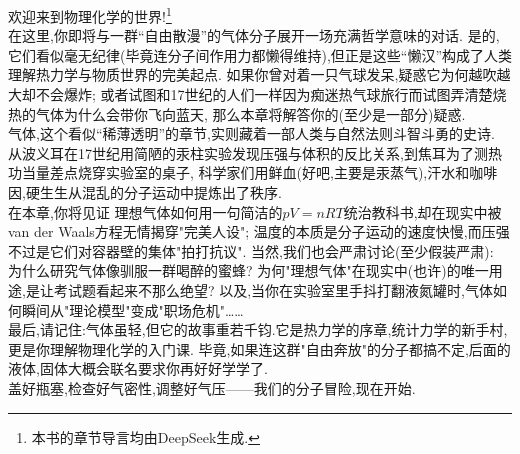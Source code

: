 \documentclass{ctexart}
\begin{document}
\pagestyle{plain}
%
\begin{center}
\end{center}\vspace{15pt}

\indent 欢迎来到物理化学的世界!\footnote{本书的章节导言均由DeepSeek生成.}\\
\indent 在这里,你即将与一群“自由散漫”的气体分子展开一场充满哲学意味的对话.%
是的,它们看似毫无纪律(毕竟连分子间作用力都懒得维持),但正是这些“懒汉”构成了人类理解热力学与物质世界的完美起点.%
如果你曾对着一只气球发呆,疑惑它为何越吹越大却不会爆炸;%
或者试图和17世纪的人们一样因为痴迷热气球旅行而试图弄清楚烧热的气体为什么会带你飞向蓝天,%
那么本章将解答你的(至少是一部分)疑惑.\\
\indent 气体,这个看似“稀薄透明”的章节,实则藏着一部人类与自然法则斗智斗勇的史诗.%
从波义耳在17世纪用简陋的汞柱实验发现压强与体积的反比关系,到焦耳为了测热功当量差点烧穿实验室的桌子,%
科学家们用鲜血(好吧,主要是汞蒸气),汗水和咖啡因,硬生生从混乱的分子运动中提炼出了秩序.\\
\indent 在本章,你将见证%
理想气体如何用一句简洁的$pV=nRT$统治教科书,却在现实中被van der Waals方程无情揭穿"完美人设";%
温度的本质是分子运动的速度快慢,而压强不过是它们对容器壁的集体"拍打抗议".%
当然,我们也会严肃讨论(至少假装严肃):%
为什么研究气体像驯服一群喝醉的蜜蜂?%
为何"理想气体"在现实中(也许)的唯一用途,是让考试题看起来不那么绝望?%
以及,当你在实验室里手抖打翻液氮罐时,气体如何瞬间从"理论模型"变成"职场危机"……\\
\indent 最后,请记住:气体虽轻,但它的故事重若千钧.它是热力学的序章,统计力学的新手村,更是你理解物理化学的入门课.%
毕竟,如果连这群"自由奔放"的分子都搞不定,后面的液体,固体大概会联名要求你再好好学学了.\\
\indent 盖好瓶塞,检查好气密性,调整好气压——我们的分子冒险,现在开始.
\newpage
\newpage
\newpage
\end{document}
